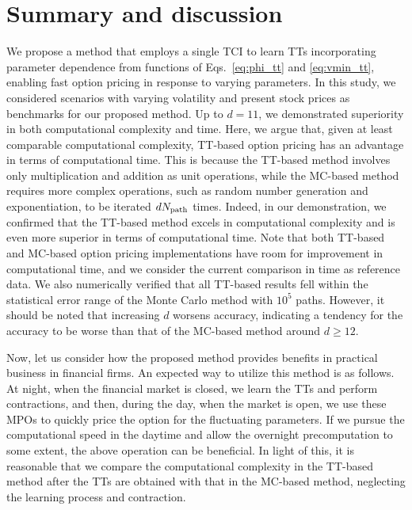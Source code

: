 \section{Summary and discussion}\label{sec:summary}
We propose a method that employs a single TCI to learn TTs incorporating parameter dependence from functions of Eqs.~\eqref{eq:phi_tt} and \eqref{eq:vmin_tt}, enabling fast option pricing in response to varying parameters. 
In this study, we considered scenarios with varying volatility and present stock prices as benchmarks for our proposed method. 
Up to \(d=11\), we demonstrated superiority in both computational complexity and time.
Here, we argue that, given at least comparable computational complexity, TT-based option pricing has an advantage in terms of computational time. 
This is because the TT-based method involves only multiplication and addition as unit operations, while the MC-based method requires more complex operations, such as random number generation and exponentiation, to be iterated \(d N_{\rm path}\) times. 
Indeed, in our demonstration, we confirmed that the TT-based method excels in computational complexity and is even more superior in terms of computational time.
Note that both TT-based and MC-based option pricing implementations have room for improvement in computational time, and we consider the current comparison in time as reference data.
We also numerically verified that all TT-based results fell within the statistical error range of the Monte Carlo method with \(10^5\) paths. 
However, it should be noted that increasing \(d\) worsens accuracy, indicating a tendency for the accuracy to be worse than that of the MC-based method around \(d \ge 12\).

Now, let us consider how the proposed method provides benefits in practical business in financial firms.
An expected way to utilize this method is as follows.
At night, when the financial market is closed, we learn the TTs and perform contractions, and then, during the day, when the market is open, we use these MPOs to quickly price the option for the fluctuating parameters.
If we pursue the computational speed in the daytime and allow the overnight precomputation to some extent, the above operation can be beneficial.
In light of this, it is reasonable that we compare the computational complexity in the TT-based method after the TTs are obtained with that in the MC-based method, neglecting the learning process and contraction.

